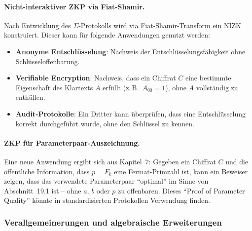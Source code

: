 ﻿\documentclass[a4paper,12pt]{scrreprt}
\theoremstyle{definition}
\begin{document}
\paragraph{Nicht-interaktiver ZKP via Fiat-Shamir.}
Nach Entwicklung des $\Sigma$-Protokolls wird via Fiat-Shamir-Transform \cite{BFM88} ein NIZK konstruiert. Dieser kann für folgende Anwendungen genutzt werden:
\begin{itemize}
    \item \textbf{Anonyme Entschlüsselung}: Nachweis der Entschlüsselungsfähigkeit ohne Schlüsseloffenbarung.
    \item \textbf{Verifiable Encryption}: Nachweis, dass ein Chiffrat $C$ eine bestimmte Eigenschaft des Klartexts $A$ erfüllt (z.\,B.\ $A_{00} = 1$), ohne $A$ vollständig zu enthüllen.
    \item \textbf{Audit-Protokolle}: Ein Dritter kann überprüfen, dass eine Entschlüsselung korrekt durchgeführt wurde, ohne den Schlüssel zu kennen.
\end{itemize}

\paragraph{ZKP für Parameterpaar-Auszeichnung.}
Eine neue Anwendung ergibt sich aus Kapitel~7: Gegeben ein Chiffrat $C$ und die öffentliche Information, dass $p = F_k$ eine Fermat-Primzahl ist, kann ein Beweiser zeigen, dass das verwendete Parameterpaar ``optimal'' im Sinne von Abschnitt~19.1 ist -- ohne $a$, $b$ oder $p$ zu offenbaren. Dieses ``Proof of Parameter Quality'' könnte in standardisierten Protokollen Verwendung finden.

\subsubsection{Verallgemeinerungen und algebraische Erweiterungen}
\end{document}
